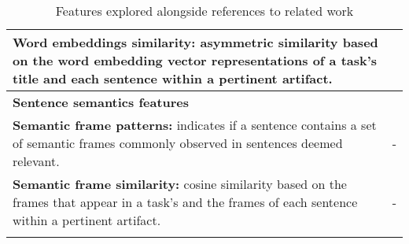 \begin{table}[H]
\begin{small}
\begin{tabular}{lr}
\parbox[l][1.5cm][c]{11cm}{ 
    \textbf{Word embeddings similarity:} asymmetric similarity based on the word embedding vector representations of a task's title and each sentence within a pertinent artifact.
} & \cite{Xu2017, silva2019} \\  

\hline

\parbox[l][0.5cm][c]{11cm}{
    \textbf{Sentence semantics features}
} &  \\ 

\parbox[l][1cm][c]{11cm}{ 
    \textbf{Semantic frame patterns:} indicates if a sentence contains a set of semantic 
    frames commonly observed in sentences deemed relevant.    
} & - \\  

\parbox[l][1cm][c]{11cm}{ 
    \textbf{Semantic frame similarity:} cosine similarity based on the frames that appear 
    in a task's and the frames of each sentence within a pertinent artifact.
} & - \\  

\hline

\parbox[l][0.5cm][c]{11cm}{ 
} & \\

\end{tabular}
\end{small}
\caption{Features explored alongside references to related work}
\label{tbl:approach-textual-features}
\end{table}

